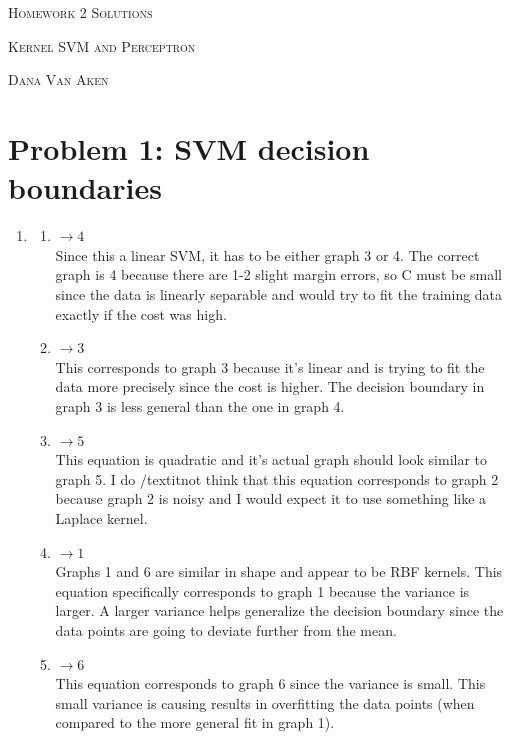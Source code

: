 \documentclass{article}
\begin{document}
\section*{}
\begin{center}
  \centerline{\textsc{\LARGE Homework 2{\if{} Solutions \else \fi}}}
  \vspace{0.5em}
  \centerline{\textsc{\Large Kernel SVM and Perceptron}}
  \vspace{1em}
  \textsc{\large Dana Van Aken} \\
\end{center}

\section*{Problem 1: SVM decision boundaries}
\begin{enumerate}
	\item
	\begin{enumerate}
		\item $\longrightarrow 4$\\
		Since this a linear SVM, it has to be either graph 3 or 4. The correct graph is 4 because there are 1-2 slight margin errors, so C must be small since the data is linearly separable and would try to fit the training data exactly if the cost was high.
		\item $\longrightarrow 3$\\
		This corresponds to graph 3 because it's linear and is trying to fit the data more precisely since the cost is higher. The decision boundary in graph 3 is less general than the one in graph 4.
		\item $\longrightarrow 5$\\
		This equation is quadratic and it's actual graph should look similar to graph 5. I do /textit{not} think that this equation corresponds to graph 2 because graph 2 is noisy and I would expect it to use something like a Laplace kernel.  
		\item $\longrightarrow 1$\\
		Graphs 1 and 6 are similar in shape and appear to be RBF kernels. This equation specifically corresponds to graph 1 because the variance is larger. A larger variance helps generalize the decision boundary since the data points are going to deviate further from the mean.
		\item $\longrightarrow 6$\\
		This equation corresponds to graph 6 since the variance is small. This small variance is causing results in overfitting the data points (when compared to the more general fit in graph 1).

\end{enumerate}
\end{enumerate}
\end{document}
